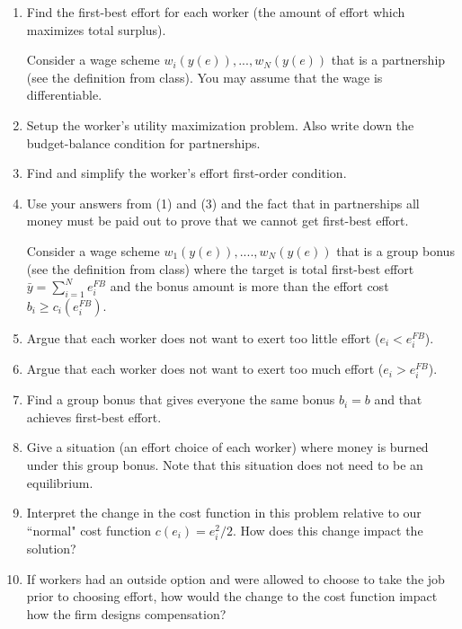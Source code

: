 \documentclass{article}
\begin{document}
\begin{enumerate}
    \item Find the first-best effort for each worker (the amount of effort which maximizes total surplus).

 Consider a wage scheme $w_i(y(e)), ...,w_N(y(e))$ that is a partnership (see the definition from class). You may assume that the wage is differentiable.

    
    \item  Setup the worker's utility maximization problem. Also write down the budget-balance condition for partnerships.
    \item Find and simplify the worker's effort first-order condition.
    \item Use your answers from (1) and (3) and the fact that in partnerships all money must be paid out to prove that we cannot get first-best effort.

  Consider a wage scheme  $w_1(y(e)),...., w_N(y(e))$ that is a group bonus (see the definition from class) where the target is total first-best effort $\bar y = \sum_{i=1}^N e_i^{FB}$ and the bonus amount is more than the effort cost $b_i\geq c_i(e_i^{FB})$.

    \item Argue that each worker does not want to exert too little effort ($e_i<e_i^{FB}$).

    \item Argue that each worker does not want to exert too much effort ($e_i>e_i^{FB}$).

    \item Find a group bonus that gives everyone the same bonus $b_i=b$ and that achieves first-best effort.

 \item Give a situation (an effort choice of each worker) where money is burned under this group bonus. Note that this situation does not need to be an equilibrium.


\item Interpret the change in the cost function in this problem relative to our ``normal" cost function $c(e_i)=e_i^2/2$. How does this change impact the solution?


\item If workers had an outside option and were allowed to choose to take the job prior to choosing effort, how would the change to the cost function impact how the firm designs compensation?


    

    
\end{enumerate}
\end{document}
